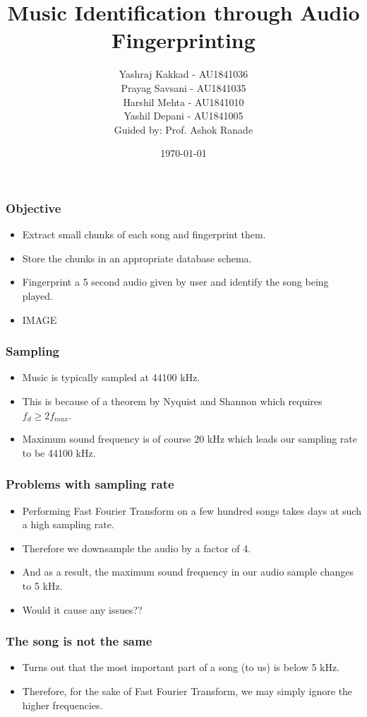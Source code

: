 \documentclass{beamer}
\author{Yashraj Kakkad - AU1841036 \\
        Prayag Savsani - AU1841035 \\
        Harshil Mehta - AU1841010 \\
        Yashil Depani - AU1841005 \\
        \vspace{8pt}Guided by: Prof. Ashok Ranade}
\title{Music Identification through Audio Fingerprinting}
\institute{Ahmedabad University}
\date{\today}
\begin{document}
\maketitle

\begin{frame}[t] %
\frametitle{Objective}
\begin{itemize}
    \item Extract small chunks of each song and fingerprint them.
    \item Store the chunks in an appropriate database schema. 
    \item Fingerprint a 5 second audio given by user and identify the song being played.
    \item IMAGE
\end{itemize}
\end{frame}

\begin{frame}[t]
\frametitle{Sampling}
\begin{itemize}
    \item Music is typically sampled at 44100 kHz.
    \item This is because of a theorem by Nyquist and Shannon which requires \(f_{d} \ge 2f_{max}\).
    \item Maximum sound frequency is of course 20 kHz which leads our sampling rate to be 44100 kHz.
\end{itemize}        
\end{frame}


\begin{frame}[t]
    \frametitle{Problems with sampling rate}
    \begin{itemize}
        \item Performing Fast Fourier Transform on a few hundred songs takes days at such a high sampling rate.
        \item Therefore we downsample the audio by a factor of 4. 
        \item And as a result, the maximum sound frequency in our audio sample changes to 5 kHz. 
        \item Would it cause any issues??
    \end{itemize}
\end{frame}

\begin{frame}[t]
    \frametitle{The song is not the same}   
    \begin{itemize}
        \item Turns out that the most important part of a song (to us) is below 5 kHz.
        \item Therefore, for the sake of Fast Fourier Transform, we may simply ignore the higher frequencies.
    \end{itemize}
\end{frame}
    
\end{document}
